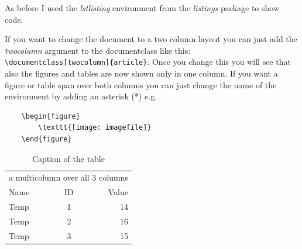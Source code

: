 \documentclass{article}
\numberwithin{equation}{section}
\begin{document}
As before I used the \textit{lstlisting} environment from the \textit{listings} package to show code.

If you want to change the document to a two column layout you can just add the \textit{twocolumn} argument to the documentclass like this:\\ \texttt{\textbackslash documentclass[twocolumn]\{article\}}. Once you change this you will see that also the figures and tables are now shown only in one column. If you want a figure or table span over both columns you can just change the name of the environment by adding an asterisk (*) e.g.

\begin{lstlisting}
	\begin{figure}
		\texttt{[image: imagefile]}
	\end{figure}
\end{lstlisting}


\begin{table}[h!]
	\centering
	\caption[First table]{Caption of the table}
	\label{tab:my_label}
	\begin{tabular}{lcr}\hline
		\multicolumn{3}{c}{a multicolumn over all 3 columns} \\
		Name & ID & Value\\\hline
		Temp & 1  & 14  \\
		Temp & 2  & 16 \\
		Temp & 3 & 15 \\ \hline
	\end{tabular}
\end{table}




\end{document}
